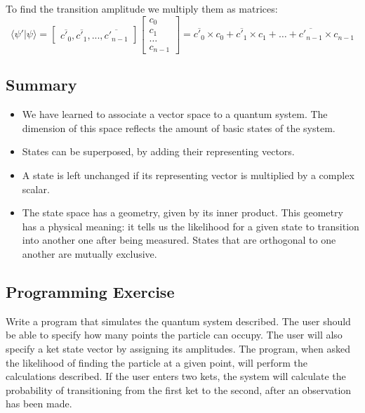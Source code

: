 \documentclass{article}
\begin{document}
To find the transition amplitude we multiply them as matrices:
\begin{equation}
\langle\psi'| \psi\rangle = 
\begin{bmatrix}\overline{c'_0}, \overline{c'_1}, ..., \overline{c'_{n-1}}\end{bmatrix}
\begin{bmatrix}c_0\\c_1\\\ldots\\c_{n-1}\end{bmatrix}
= \overline{c'_0} \times c_0 + \overline{c'_1} \times c_1 + \ldots + \overline{c'_{n-1}} \times c_{n-1}
\end{equation}

\subsection{Summary}
\begin{itemize}
    \item We have learned to associate a vector space to a quantum system. The dimension of this space reflects the amount of basic states of the system.
    \item States can be superposed, by adding their representing vectors.
    \item A state is left unchanged if its representing vector is multiplied by a complex scalar.
    \item The state space has a geometry, given by its inner product. This geometry has a physical meaning: it tells us the likelihood for a given state to transition into another one after being measured. States that are orthogonal to one another are mutually exclusive.
\end{itemize}

\subsection{Programming Exercise}
Write a program that simulates the quantum system described. The user should be able to specify how many points the particle can occupy. The user will also specify a ket state vector by assigning its amplitudes. The program, when asked the likelihood of finding the particle at a given point, will perform the calculations described. If the user enters two kets, the system will calculate the probability of transitioning from the first ket to the second, after an observation has been made.\\
\end{document}
